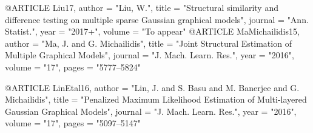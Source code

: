 @ARTICLE {Liu17,
    author  = "Liu, W.",
    title   = "{Structural similarity and difference testing on multiple sparse Gaussian graphical models}",
    journal = "Ann. Statist.",
    year    = "2017+",
    volume  = "To appear"
}
@ARTICLE {MaMichailidis15,
    author  = "Ma, J. and G. Michailidis",
    title   = "{Joint Structural Estimation of Multiple Graphical Models}",
    journal = "J. Mach. Learn. Res.",
    year    = "2016",
    volume  = "17",
    pages   = "5777--5824"
}

@ARTICLE {LinEtal16,
    author  = "Lin, J. and S. Basu and M. Banerjee and G. Michailidis",
    title   = "{Penalized Maximum Likelihood Estimation of Multi-layered Gaussian Graphical Models}",
    journal = "J. Mach. Learn. Res.",
    year    = "2016",
    volume  = "17",
    pages   = "5097--5147"
}